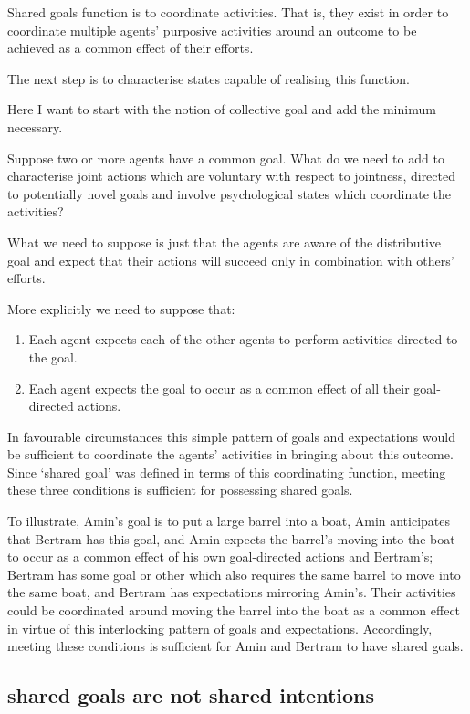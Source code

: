 \documentclass[12pt,a4paper]{extarticle}
\begin{document}
Shared goals function is to coordinate activities. That is, they exist in order to coordinate multiple agents’ purposive activities around an outcome to be achieved as a common effect of their efforts. 

The next step is to characterise states capable of realising this function.

Here I want to start with the notion of collective goal and add the minimum necessary.  

Suppose two or more agents have a common goal.  What do we need to add to characterise joint actions which are voluntary with respect to jointness, directed to potentially novel goals and involve psychological states which coordinate the activities?

What we need to suppose is just that the agents are aware of the distributive goal and expect that their actions will succeed only in combination with others' efforts.

More explicitly we need to suppose that:
%
\begin{enumerate}
\item Each agent expects each of the other agents to perform activities directed to the goal.
\item Each agent expects the goal to occur as a common effect of all their goal-directed actions.
\end{enumerate}
%
In favourable circumstances this simple pattern of goals and expectations would be sufficient to coordinate the agents’ activities in bringing about this outcome. Since `shared goal' was defined in terms of this coordinating function, meeting these three conditions is sufficient for possessing shared goals.

To illustrate, Amin’s goal is to put a large barrel into a boat, Amin anticipates that Bertram has this goal, and Amin expects the barrel’s moving into the boat to occur as a common effect of his own goal-directed actions and Bertram’s; Bertram has some goal or other which also requires the same barrel to move into the same boat, and Bertram has expectations mirroring Amin’s. Their activities could be coordinated around moving the barrel into the boat as a common effect in virtue of this interlocking pattern of goals and expectations. Accordingly, meeting these conditions is sufficient for Amin and Bertram to have shared goals.

\subsection{shared goals are not shared intentions}
\end{document}
